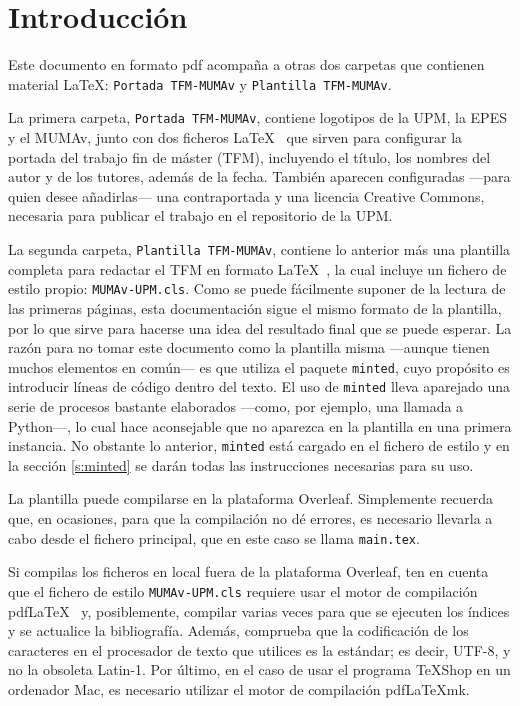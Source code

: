 
\chapter{Introducción}
\label{ch:introduccion}
Este documento en formato {\sffamily pdf} acompaña a otras dos carpetas que contienen material \LaTeX: \texttt{Portada TFM-MUMAv} y \texttt{Plantilla TFM-MUMAv}. 

La primera carpeta, \texttt{Portada TFM-MUMAv}, contiene  logotipos de la UPM, la EPES y el MUMAv, junto con dos ficheros \LaTeX~ que sirven para configurar la portada del trabajo fin de máster (TFM), incluyendo el título, los nombres del autor y de los tutores, además de la fecha. También aparecen configuradas ---para quien desee añadirlas--- una contraportada y una licencia Creative Commons, necesaria para publicar el trabajo en el repositorio de la UPM.

La segunda carpeta, \texttt{Plantilla TFM-MUMAv}, contiene lo anterior más una plantilla completa para redactar el TFM en formato \LaTeX~, la cual incluye un fichero de estilo propio: \texttt{MUMAv-UPM.cls}. Como se puede fácilmente suponer de la lectura de las primeras páginas, esta documentación sigue el mismo formato de la plantilla, por lo que sirve para hacerse una idea del resultado final que se puede esperar. La razón para no tomar este documento como la plantilla misma ---aunque tienen muchos elementos en común--- es que utiliza el paquete \texttt{minted}, cuyo propósito es introducir líneas de código dentro del texto. El uso de \texttt{minted} lleva aparejado una serie de procesos bastante elaborados ---como, por ejemplo, una llamada a Python---, lo cual hace aconsejable que no aparezca en la plantilla en una primera instancia. No obstante lo anterior, \texttt{minted} está cargado en el fichero de estilo y en la sección \ref{s:minted} se darán todas las instrucciones necesarias para su uso.

La plantilla puede compilarse en la plataforma Overleaf. Simplemente recuerda que, en ocasiones, para que la compilación no dé errores, es necesario llevarla a cabo desde el fichero principal, que en este caso se llama \texttt{main.tex}. 

Si compilas los ficheros en local fuera de la plataforma Overleaf, ten en cuenta que el fichero de estilo \texttt{MUMAv-UPM.cls} requiere usar el motor de compilación pdf\LaTeX~ y, posiblemente, compilar varias veces para que se ejecuten los índices y se actualice la bibliografía. Además, comprueba que la codificación de los caracteres en el procesador de texto que utilices es la estándar; es decir, UTF-8,  y no la obsoleta Latin-1. Por último, en el caso de usar el programa TeXShop en un ordenador Mac, es necesario utilizar el motor de compilación pdf\LaTeX mk.


